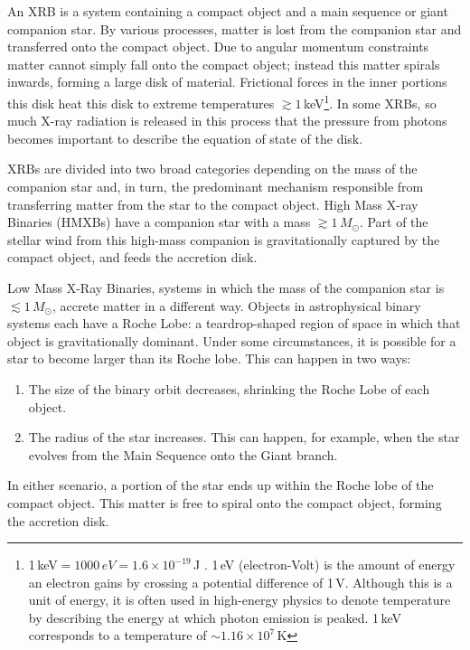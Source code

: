 \par An XRB is a system containing a compact object and a main sequence or giant companion star.  By various processes, matter is lost from the companion star and transferred onto the compact object.  Due to angular momentum constraints matter cannot simply fall onto the compact object; instead this matter spirals inwards, forming a large disk of material.  Frictional forces in the inner portions this disk heat this disk to extreme temperatures $\gtrsim1$\,keV\footnote{1\,keV$=1000\,eV=1.6\times10^{-19}$\,J .  1\,eV (electron-Volt) is the amount of energy an electron gains by crossing a potential difference of 1\,V.  Although this is a unit of energy, it is often used in high-energy physics to denote temperature by describing the energy at which photon emission is peaked.  1\,keV corresponds to a temperature of $\sim1.16\times10^7$\,K}.  In some XRBs, so much X-ray radiation is released in this process that the pressure from photons becomes important to describe the equation of state of the disk.
\par XRBs are divided into two broad categories depending on the mass of the companion star and, in turn, the predominant mechanism responsible from transferring matter from the star to the compact object.  High Mass X-ray Binaries (HMXBs) have a companion star with a mass $\gtrsim1\,M_\odot$.  Part of the stellar wind from this high-mass companion is gravitationally captured by the compact object, and feeds the accretion disk.
\par Low Mass X-Ray Binaries, systems in which the mass of the companion star is $\lesssim1\,M_\odot$, accrete matter in a different way.  Objects in astrophysical binary systems each have a Roche Lobe: a teardrop-shaped region of space in which that object is gravitationally dominant.  Under some circumstances, it is possible for a star to become larger than its Roche lobe.  This can happen in two ways:
\begin{enumerate}
\item The size of the binary orbit decreases, shrinking the Roche Lobe of each object.
\item The radius of the star increases.  This can happen, for example, when the star evolves from the Main Sequence onto the Giant branch.
\end{enumerate}
In either scenario, a portion of the star ends up within the Roche lobe of the compact object.  This matter is free to spiral onto the compact object, forming the accretion disk.

